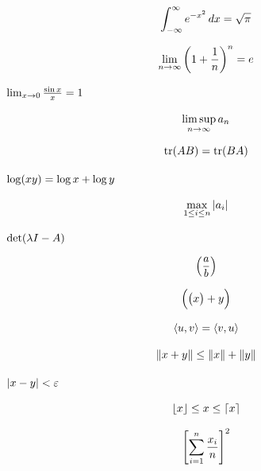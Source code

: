 \documentclass{article}
\newcommand*\pdfcraftbegin[1]{\special{pdfcraft:eq:#1:begin}}
\newcommand*\pdfcraftend[1]{\special{pdfcraft:eq:#1:end}}
\begin{document}
\par
\newpage
\setcounter{equation}{0}
\[\pdfcraftbegin{int_gaussian}
\int_{-\infty}^{\infty} e^{-x^2}\,dx = \sqrt{\pi}
\pdfcraftend{int_gaussian}\]
\par
\newpage
\setcounter{equation}{0}
\[\pdfcraftbegin{lim_compound}
\lim_{n \to \infty} \left(1 + \frac{1}{n}\right)^{n} = e
\pdfcraftend{lim_compound}\]
\par
\newpage
\setcounter{equation}{0}
$\pdfcraftbegin{lim_inline}
\lim_{x \to 0} \frac{\sin x}{x} = 1
\pdfcraftend{lim_inline}$
\par
\newpage
\setcounter{equation}{0}
\[\pdfcraftbegin{limsup}
\limsup_{n \to \infty} a_n
\pdfcraftend{limsup}\]
\par
\newpage
\setcounter{equation}{0}
\[\pdfcraftbegin{operatorname_trace}
\operatorname{tr}(AB) = \operatorname{tr}(BA)
\pdfcraftend{operatorname_trace}\]
\par
\newpage
\setcounter{equation}{0}
$\pdfcraftbegin{log_product}
\log(xy) = \log x + \log y
\pdfcraftend{log_product}$
\par
\newpage
\setcounter{equation}{0}
\[\pdfcraftbegin{max_abs}
\max_{1 \le i \le n} |a_i|
\pdfcraftend{max_abs}\]
\par
\newpage
\setcounter{equation}{0}
$\pdfcraftbegin{det_char}
\det(\lambda I - A)
\pdfcraftend{det_char}$
\par
\newpage
\setcounter{equation}{0}
\[\pdfcraftbegin{left_right_paren}
\left( \frac{a}{b} \right)
\pdfcraftend{left_right_paren}\]
\par
\newpage
\setcounter{equation}{0}
\[\pdfcraftbegin{manual_sizes}
\Bigl( \bigl( x \bigr) + y \Bigr)
\pdfcraftend{manual_sizes}\]
\par
\newpage
\setcounter{equation}{0}
\[\pdfcraftbegin{angle_brackets}
\langle u, v \rangle = \langle v, u \rangle
\pdfcraftend{angle_brackets}\]
\par
\newpage
\setcounter{equation}{0}
\[\pdfcraftbegin{norm_triangle}
\| x + y \| \le \| x \| + \| y \|
\pdfcraftend{norm_triangle}\]
\par
\newpage
\setcounter{equation}{0}
$\pdfcraftbegin{abs_epsilon}
|x - y| < \varepsilon
\pdfcraftend{abs_epsilon}$
\par
\newpage
\setcounter{equation}{0}
\[\pdfcraftbegin{floor_ceiling}
\lfloor x \rfloor \le x \le \lceil x \rceil
\pdfcraftend{floor_ceiling}\]
\par
\newpage
\setcounter{equation}{0}
\[\pdfcraftbegin{left_right_tall}
\left[ \sum_{i=1}^{n} \frac{x_i}{n} \right]^{2}
\pdfcraftend{left_right_tall}\]
\end{document}
